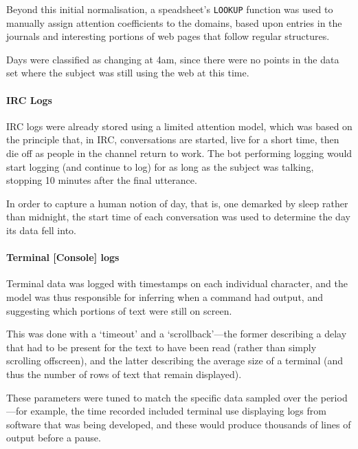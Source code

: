 Beyond this initial normalisation, a speadsheet's \texttt{LOOKUP} function was used to manually assign attention coefficients to the domains, based upon entries in the journals and interesting portions of web pages that follow regular structures.

Days were classified as changing at 4am, since there were no points in the data set where the subject was still using the web at this time.



\paragraph{IRC Logs}
IRC logs were already stored using a limited attention model, which was based on the principle that, in IRC, conversations are started, live for a short time, then die off as people in the channel return to work.  The bot performing logging would start logging (and continue to log) for as long as the subject was talking, stopping 10 minutes after the final utterance.

In order to capture a human notion of day, that is, one demarked by sleep rather than midnight, the start time of each conversation was used to determine the day its data fell into.



\paragraph{Terminal [Console] logs}
Terminal data was logged with timestamps on each individual character, and the model was thus responsible for inferring when a command had output, and suggesting which portions of text were still on screen.

This was done with a `timeout' and a `scrollback'---the former describing a delay that had to be present for the text to have been read (rather than simply scrolling offscreen), and the latter describing the average size of a terminal (and thus the number of rows of text that remain displayed).

These parameters were tuned to match the specific data sampled over the period---for example, the time recorded included terminal use displaying logs from software that was being developed, and these would produce thousands of lines of output before a pause.








